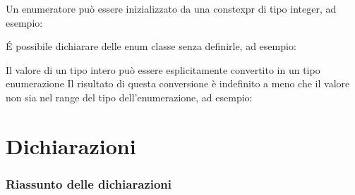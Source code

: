 \documentclass[11pt,a4paper]{book}
\begin{document}
Un enumeratore può essere inizializzato da una constexpr di tipo integer, ad esempio:
\label{code: 125}

É possibile dichiarare delle enum classe senza definirle, ad esempio:
\label{code: 126}

Il valore di un tipo intero può essere esplicitamente convertito in un tipo enumerazione Il risultato di questa conversione è indefinito a meno che il valore non sia nel range del tipo dell'enumerazione, ad esempio:
\label{code: 127}

\chapter{Dichiarazioni}
\subsection{Riassunto delle dichiarazioni}
\end{document}

